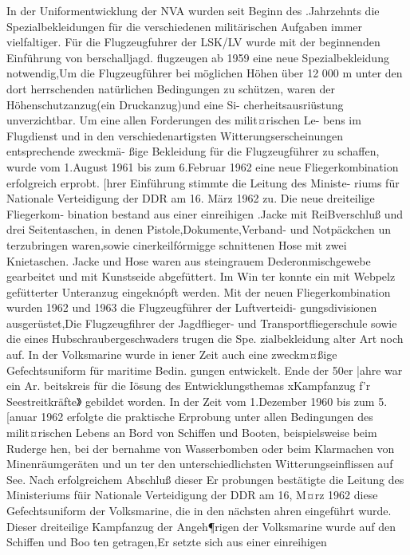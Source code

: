 

In der Uniformentwicklung der NVA wurden seit
Beginn des .Jahrzehnts die Spezialbekleidungen für
die verschiedenen militärischen Aufgaben immer
vielfaltiger.
Für die Flugzeugfuhrer der LSK/LV wurde mit
der beginnenden Einführung von berschalljagd.
flugzeugen ab 1959 eine neue Spezialbekleidung
notwendig,Um die Flugzeugführer bei möglichen
Höhen über 12 000 m unter den dort herrschenden
natürlichen Bedingungen zu schützen, waren der
Höhenschutzanzug(ein Druckanzug)und eine Si-
cherheitsausriüstung unverzichtbar.
Um eine allen Forderungen des milit¤rischen Le-
bens im Flugdienst und in den verschiedenartigsten
Witterungserscheinungen entsprechende zweckmä-
ßige Bekleidung für die Flugzeugführer zu schaffen,
wurde vom 1.August 1961 bis zum 6.Februar 1962
eine neue Fliegerkombination erfolgreich erprobt. [hrer Einführung stimmte die Leitung des Ministe-
riums für Nationale Verteidigung
der DDR am
16. März 1962 zu. Die neue dreiteilige Fliegerkom-
bination bestand aus einer einreihigen .Jacke mit
ReiBverschluß und drei Seitentaschen, in denen Pistole,Dokumente,Verband- und Notpäckchen un
terzubringen waren,sowie cinerkeilfórmigge
schnittenen Hose mit zwei Knietaschen. Jacke und
Hose waren aus steingrauem Dederonmischgewebe
gearbeitet und mit Kunstseide abgefüttert. Im Win
ter konnte ein mit Webpelz gefütterter Unteranzug
eingeknópft werden.
Mit der neuen Fliegerkombination wurden 1962
und 1963 die Flugzeugführer der Luftverteidi-
gungsdivisionen ausgerüstet,Die Flugzeugfihrer
der Jagdflieger- und Transportfliegerschule sowie
die eines Hubschraubergeschwaders trugen die Spe.
zialbekleidung alter Art noch auf.
In der Volksmarine wurde in iener Zeit auch eine
zweckm¤ßige Gefechtsuniform für maritime Bedin.
gungen entwickelt. Ende der 50er |ahre war ein Ar.
beitskreis für die Iösung des Entwicklungsthemas
xKampfanzug f'r Seestreitkräfte》 gebildet worden.
In der Zeit vom 1.Dezember 1960 bis zum 5.[anuar
1962 erfolgte die praktische Erprobung unter allen
Bedingungen des milit¤rischen Lebens an Bord von
Schiffen und Booten, beispielsweise beim Ruderge
hen, bei der bernahme von Wasserbomben oder
beim Klarmachen von Minenräumgeräten und un
ter den unterschiedlichsten Witterungseinflissen
auf See. Nach erfolgreichem Abschluß dieser Er
probungen bestätigte die Leitung des Ministeriums
füir Nationale Verteidigung der DDR am 16, M¤rz
1962 diese Gefechtsuniform der Volksmarine, die
in den nächsten ahren eingeführt wurde.
Dieser dreiteilige Kampfanzug der Angeh¶rigen
der Volksmarine wurde auf den Schiffen und Boo
ten getragen,Er setzte sich aus einer einreihigen

